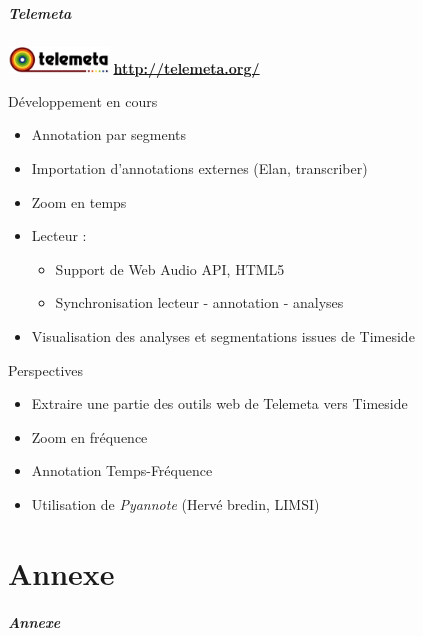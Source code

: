\documentclass[10pt, final, hyperref, table]{beamer}
\begin{document}
\begin{frame}
\frametitle{Telemeta}
    \begin{flushleft}
    \includegraphics[width=0.2\textwidth]{img/logo_telemeta_1-1.pdf} \hfill
    \colorbox{yellow!50}{\textbf{\url{http://telemeta.org/}}}
  \end{flushleft}
  \begin{block}{Développement en cours}
    \begin{itemize}
    \item Annotation par segments
    \item Importation d'annotations externes (Elan, transcriber)
    \item Zoom en temps
    \item Lecteur :
      \begin{itemize}
      \item Support de Web Audio API, HTML5
      \item Synchronisation lecteur - annotation - analyses
      \end{itemize}
    \item Visualisation des analyses et segmentations issues de Timeside 
    \end{itemize}
  \end{block}
  \begin{block}{Perspectives}
    \begin{itemize}
    \item Extraire une partie des outils web de Telemeta vers Timeside
    \item Zoom en fréquence
    \item Annotation Temps-Fréquence
    \item Utilisation de \emph{Pyannote} (Hervé bredin, LIMSI)
    \end{itemize}
  \end{block}
\end{frame}
\part{Annexe}
\begin{frame}
  \frametitle{Annexe}

\end{frame}
\end{document}
